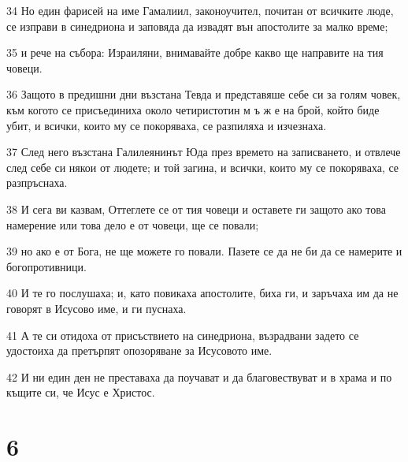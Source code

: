 \par 34 Но един фарисей на име Гамалиил, законоучител, почитан от всичките люде, се изправи в синедриона и заповяда да извадят вън апостолите за малко време;
\par 35 и рече на събора: Израиляни, внимавайте добре какво ще направите на тия човеци.
\par 36 Защото в предишни дни възстана Тевда и представяше себе си за голям човек, към когото се присъединиха около четиристотин м ъ ж е на брой, който биде убит, и всички, които му се покоряваха, се разпиляха и изчезнаха.
\par 37 След него възстана Галилеянинът Юда през времето на записването, и отвлече след себе си някои от людете; и той загина, и всички, които му се покоряваха, се разпръснаха.
\par 38 И сега ви казвам, Оттеглете се от тия човеци и оставете ги защото ако това намерение или това дело е от човеци, ще се повали;
\par 39 но ако е от Бога, не ще можете го повали. Пазете се да не би да се намерите и богопротивници.
\par 40 И те го послушаха; и, като повикаха апостолите, биха ги, и заръчаха им да не говорят в Исусово име, и ги пуснаха.
\par 41 А те си отидоха от присъствието на синедриона, възрадвани задето се удостоиха да претърпят опозоряване за Исусовото име.
\par 42 И ни един ден не преставаха да поучават и да благовествуват и в храма и по къщите си, че Исус е Христос.

\chapter{6}

